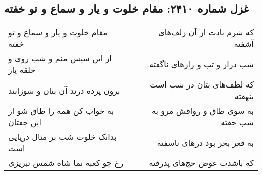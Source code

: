\begin{center}
\section*{غزل شماره ۲۴۱۰: مقام خلوت و یار و سماع و تو خفته}
\label{sec:2410}
\begin{longtable}{l p{0.5cm} r}
مقام خلوت و یار و سماع و تو خفته
&&
که شرم بادت از آن زلف‌های آشفته
\\
از این سپس منم و شب روی و حلقه یار
&&
شب دراز و تب و رازهای ناگفته
\\
برون پرده درند آن بتان و سوزانند
&&
که لطف‌های بتان در شب است بنهفته
\\
به خواب کن همه را طاق شو از این جفتان
&&
به سوی طاق و رواقش مرو به شب جفته
\\
بدانک خلوت شب بر مثال دریایی است
&&
به قعر بحر بود درهای ناسفته
\\
رخ چو کعبه نما شاه شمس تبریزی
&&
که باشدت عوض حج‌های پذرفته
\\
\end{longtable}
\end{center}
